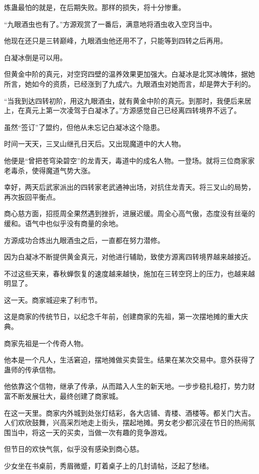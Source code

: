 \begin{this_body}
炼蛊最怕的就是，在后期失败。那样的损失，将十分惨重。

“九眼酒虫也有了。”方源观赏了一番后，满意地将酒虫收入空窍当中。

他现在还只是三转巅峰，九眼酒虫他还用不了，只能等到四转之后再用。

白凝冰倒是可以用。

但黄金中阶的真元，对空窍四壁的温养效果更加强大。白凝冰是北冥冰魄体，据她所言，她如今的资质，已经涨到了九成六。九眼酒虫对她而言，却是弊大于利的。

“当我到达四转初阶，用这九眼酒虫，就有黄金中阶的真元。到那时，我便后来居上，在真元上第一次凌驾于白凝冰了。”方源感觉自己已经离四转境界不远了。

虽然“签订”了盟约，但他从未忘记白凝冰这个隐患。

时间一天天，三叉山继孔日天后。又出现魔道中的大人物。

他便是“曾把苍穹染碧空”的龙青天，毒道中的成名人物。一登场。就将三位商家家老毒杀，使得魔道气势大涨。

幸好，两天后武家派出的四转家老武通神出场，对抗住龙青天。将三叉山的局势，再次扳回平衡点。

商心慈方面，招揽周全果然遇到挫折，进展迟缓。周全心高气傲，态度没有丝毫的缓和。语气中也似乎没有商量的余地。

方源成功合炼出九眼酒虫之后，一直都在努力潜修。

因为白凝冰不断提供黄金真元，对他进行辅助，致使方源离四转境界越来越接近。

不过这些天来，春秋蝉恢复的速度越来越快，施加在三转空窍上的压力，也越来越明显了。

这一天。商家城迎来了利市节。

这是商家的传统节日，以纪念千年前，创建商家的先祖，第一次摆地摊的重大庆典。

商家先祖是一个传奇人物。

他本是一个凡人，生活窘迫，摆地摊做买卖营生。结果在某次交易中。意外获得了蛊师的传承信物。

他依靠这个信物，继承了传承，从而踏入人生的新天地。一步步稳扎稳打，势力财富不断发展壮大，最终创建了商家城。

在这一天里。商家内外城到处张灯结彩，各大店铺、青楼、酒楼等。都关门大吉。人们欢欣鼓舞，兴高采烈地走上街头，摆起地摊。男女老少都沉浸在节日的热闹氛围当中，将这一天的买卖，当做一次有趣的竞争游戏。

但节日的欢快气氛，似乎没有感染到商心慈。

少女坐在书桌前，秀眉微蹙，盯着桌子上的几封请帖，泛起了愁绪。


\end{this_body}
